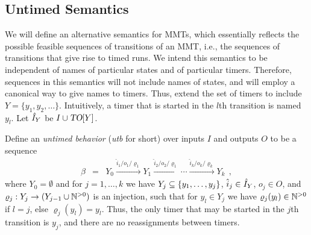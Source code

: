 
\subsection{Untimed Semantics}
We will define an alternative semantics for MMTs, which essentially reflects the
possible feasible sequences of transitions of an MMT, i.e., the sequences of
transitions that give rise to timed runs.
We intend this semantics to be independent of names of particular states and
of particular timers. Therefore, sequences in this semantics will not include
names of states, and will employ a canonical way to give names to timers. Thus,
extend the set of timers to include $Y = \{ y_1, y_2,\ldots \}$. Intuitively,
a timer that is started in the $l$th transition is named $y_l$.
Let $\hat{I}_{Y}$ be $I \cup \mbox{\sl TO}[Y]$.

Define an \emph{untimed behavior} (\emph{utb} for short)
over inputs $I$ and outputs $O$ to be a sequence 
\begin{eqnarray*}
  \beta & = & Y_0 \xrightarrow{\hat{i}_1/o_1/\varrho_1} Y_1  \xrightarrow{\hat{i}_2/o_2/\varrho_1} \cdots \xrightarrow{\hat{i}_k/o_k/\varrho_k} Y_{k}
  \ \ ,
\end{eqnarray*}
where $Y_0 = \emptyset$ and for $j = 1, \ldots , k$ we have
$Y_j \subseteq \lbrace y_1, \ldots , y_j\rbrace$, $\hat{i}_j \in \hat{I}_{Y}$, $o_j \in O$,
and $\varrho_j: Y_j \rightarrow (Y_{j-1} \cup {\mathbb N}^{>0})$ is an injection, such
that for $y_l \in Y_j$ we have $\varrho_j(y_l) \in {\mathbb N}^{>0}$ if $l=j$, else $\varrho_j(y_l) = y_l$.
Thus, the only timer that may be started in the $j$th transition is $y_j$, and there are no reassignments between timers.

